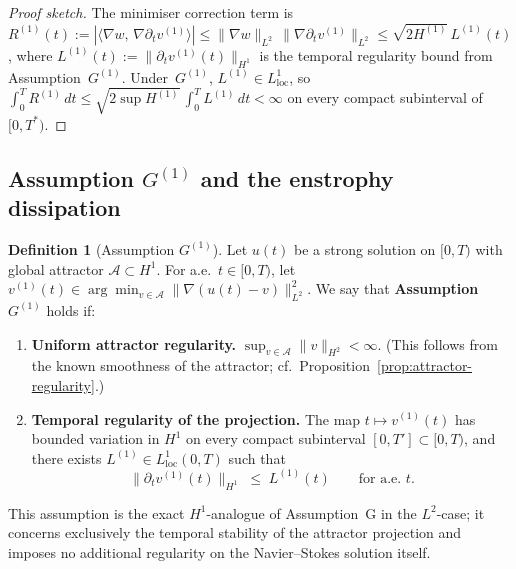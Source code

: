 \documentclass[12pt,a4paper]{article}
\theoremstyle{definition}
\newtheorem{definition}{Definition}[section]
\theoremstyle{plain}
\theoremstyle{remark}
\begin{document}
\begin{proof}[Proof sketch]
The minimiser correction term is
$R^{(1)}(t) := |\langle \nabla w,\,
\nabla\partial_t v^{(1)}\rangle|
\le \|\nabla w\|_{L^2}\,\|\nabla\partial_t v^{(1)}\|_{L^2}
\le \sqrt{2H^{(1)}}\,L^{(1)}(t)$,
where $L^{(1)}(t) := \|\partial_t v^{(1)}(t)\|_{H^1}$ is the
temporal regularity bound from Assumption~$G^{(1)}$.
Under~$G^{(1)}$, $L^{(1)} \in L^1_{\mathrm{loc}}$, so
$\int_0^T R^{(1)}\,dt
\le \sqrt{2\sup H^{(1)}}\,\int_0^T L^{(1)}\,dt < \infty$
on every compact subinterval of~$[0,T^*)$.
\end{proof}

\subsection{Assumption $G^{(1)}$ and the enstrophy dissipation}

\begin{definition}[Assumption $G^{(1)}$]\label{ass:G1}
Let $u(t)$ be a strong solution on $[0,T)$ with global attractor
$\mathcal{A} \subset H^1$.  For a.e.\ $t \in [0,T)$, let
$v^{(1)}(t) \in \arg\min_{v \in \mathcal{A}}
\|\nabla(u(t)-v)\|_{L^2}^2$.
We say that \textbf{Assumption~$G^{(1)}$} holds if:
\begin{enumerate}
  \item[\emph{($G^{(1)}.1$)}]
    \textbf{Uniform attractor regularity.}\;
    $\sup_{v \in \mathcal{A}}\|v\|_{H^2} < \infty$.
    (This follows from the known smoothness of the attractor;
    cf.\ Proposition~\ref{prop:attractor-regularity}.)
  \item[\emph{($G^{(1)}.2$)}]
    \textbf{Temporal regularity of the projection.}\;
    The map $t \mapsto v^{(1)}(t)$ has bounded variation in $H^1$
    on every compact subinterval $[0,T'] \subset [0,T)$, and
    there exists $L^{(1)} \in L^1_{\mathrm{loc}}(0,T)$ such that
    \[
      \|\partial_t v^{(1)}(t)\|_{H^1}
      \;\le\; L^{(1)}(t)
      \qquad \text{for a.e.\ } t.
    \]
\end{enumerate}
This assumption is the exact $H^1$-analogue of Assumption~G in the
$L^2$-case; it concerns exclusively the temporal stability of the
attractor projection and imposes no additional regularity on the
Navier--Stokes solution itself.
\end{definition}
\end{document}
